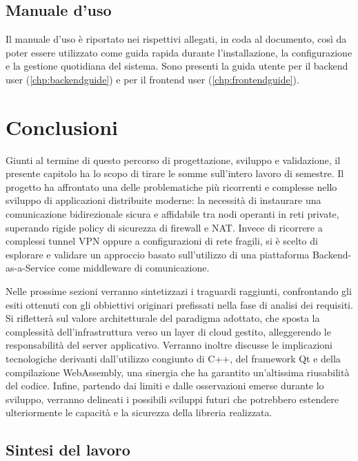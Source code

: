 \documentclass[a4paper, 11pt, twoside]{report}
\begin{document}
\section{Manuale d'uso}

Il manuale d'uso è riportato nei rispettivi allegati, in coda al documento, così da poter essere utilizzato come guida rapida
durante l'installazione, la configurazione e la gestione quotidiana del sistema.
Sono presenti la guida utente per il backend user (\ref{chp:backendguide}) e per il frontend user (\ref{chp:frontendguide}).

\chapter{Conclusioni}

Giunti al termine di questo percorso di progettazione, sviluppo e validazione, il presente capitolo ha lo scopo di tirare le somme
sull'intero lavoro di semestre. Il progetto ha affrontato una delle problematiche più ricorrenti e complesse nello sviluppo di
applicazioni distribuite moderne: la necessità di instaurare una comunicazione bidirezionale sicura e affidabile tra nodi operanti
in reti private, superando rigide policy di sicurezza di firewall e NAT. Invece di ricorrere a complessi tunnel VPN oppure a
configurazioni di rete fragili, si è scelto di esplorare e validare un approccio basato sull'utilizzo di una piattaforma
Backend-as-a-Service come middleware di comunicazione.

Nelle prossime sezioni verranno sintetizzazi i traguardi raggiunti, confrontando gli esiti ottenuti con gli obbiettivi originari
prefissati nella fase di analisi dei requisiti.
Si rifletterà sul valore architetturale del paradigma adottato, che sposta la complessità dell'infrastruttura verso un layer di cloud
gestito, alleggerendo le responsabilità del server applicativo.
Verranno inoltre discusse le implicazioni tecnologiche derivanti dall'utilizzo congiunto di C++, del framework Qt e della compilazione
WebAssembly, una sinergia che ha garantito un'altissima riusabilità del codice.
Infine, partendo dai limiti e dalle osservazioni emerse durante lo sviluppo, verranno delineati i possibili sviluppi futuri che
potrebbero estendere ulteriormente le capacità e la sicurezza della libreria realizzata.

\newpage

\section{Sintesi del lavoro}
\end{document}
